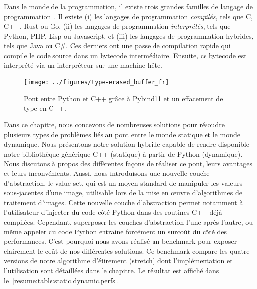 Dans le monde de la programmation, il existe trois grandes familles de langage de
programmation~\parencite{prechelt.2000.comparison}. Il existe (i) les langages de programmation \emph{compilés}, tels
que C, C++, Rust ou Go, (ii) les langages de programmation \emph{interprétés}, tels que Python, PHP, Lisp ou Javascript,
et (iii) les langages de programmation hybrides, tels que Java ou C\#. Ces derniers ont une passe de compilation rapide
qui compile le code source dans un bytecode intermédiaire. Ensuite, ce bytecode est interprété via un interpréteur sur
une machine hôte.

\begin{figure}[htbp]
  \centering
  \texttt{[image: ../figures/type-erased\_buffer\_fr]}
  \caption[]{Pont entre Python et C++ grâce à Pybind11 et un effacement de type en C++.}
  \label{resume:fig:type-erased.buffer}
\end{figure}

Dans ce chapitre, nous concevons de nombreuses solutions pour résoudre plusieurs types de problèmes liés au pont entre
le monde statique et le monde dynamique. Nous présentons notre solution hybride capable de rendre disponible notre
bibliothèque générique C++ (statique) à partir de Python (dynamique). Nous discutons à propos des différentes façons de
réaliser ce pont, leurs avantages et leurs inconvénients. Aussi, nous introduisons une nouvelle couche d'abstraction, le
value-set, qui est un moyen standard de manipuler les valeurs sous-jacentes d'une image, utilisable lors de la mise en
\oe{}uvre d'algorithmes de traitement d'images. Cette nouvelle couche d'abstraction permet notamment à l'utilisateur
d'injecter du code côté Python dans des routines C++ déjà compilées. Cependant, superposer les couches d'abstraction
l'une après l'autre, ou même appeler du code Python entraîne forcément un surcoût du côté des performances. C'est
pourquoi nous avons réalisé un benchmark pour exposer clairement le coût de nos différentes solutions. Ce benchmark
compare les quatre versions de notre algorithme d'étirement (stretch) dont l'implémentation et l'utilisation sont
détaillées dans le chapitre. Le résultat est affiché dans le~\cref{resume:table:static.dynamic.perfs}.

